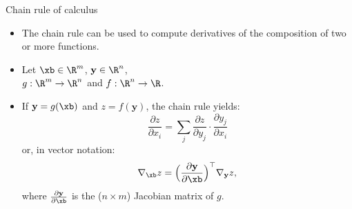 










\begin{vbframe}{Chain rule of calculus}
  \begin{itemize}
    \item The chain rule can be used to compute derivatives of the composition of two or more functions.
    \item Let $\xb \in \R^m$, $\mathbf{y} \in \R^n$, \\
          $g: \R^m \to \R^n$ and $f: \R^n \to \R$. \\
    \item If $\mathbf{y} = g(\xb)$ and $z = f(\mathbf{y})$, the chain rule yields: $$\frac{\partial z}{\partial x_i} = \sum_j \frac{\partial z}{\partial y_j} \cdot \frac{\partial y_j}{\partial x_i}$$
          or, in vector notation: $$\nabla_{\xb} z = \Big(\frac{\partial \mathbf{y}}{\partial \xb}\Big)^\top \nabla_{\mathbf{y}} z,$$
          where $\frac{\partial \mathbf{y}}{\partial \xb}$ is the ($n \times m$) Jacobian matrix of $g$.
  \end{itemize}
\end{vbframe}  

